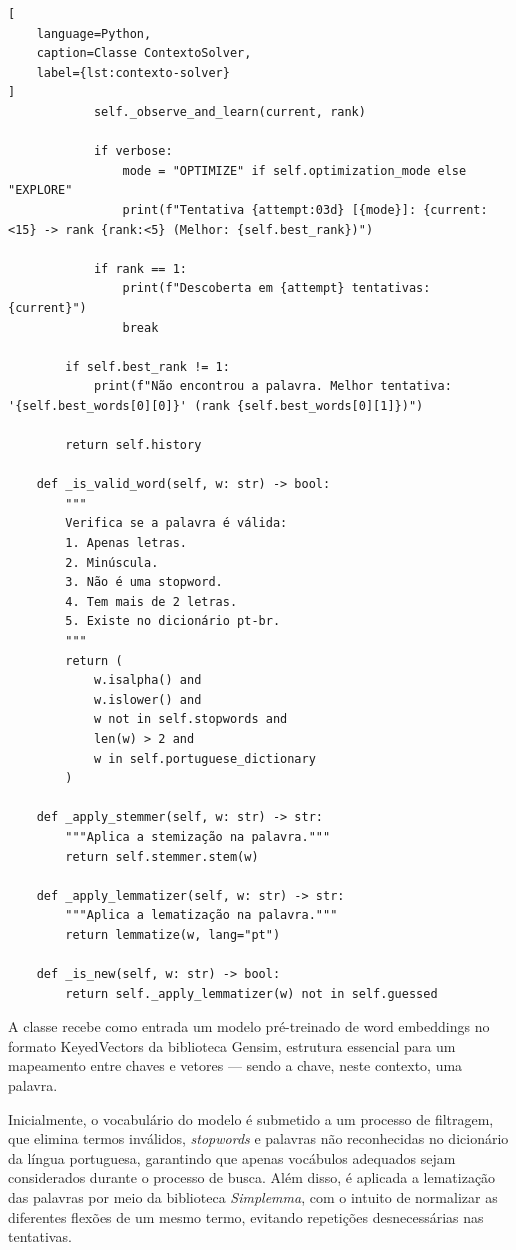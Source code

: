 \begin{lstlisting}[
    language=Python,
    caption=Classe ContextoSolver,
    label={lst:contexto-solver}
]
            self._observe_and_learn(current, rank)
            
            if verbose:
                mode = "OPTIMIZE" if self.optimization_mode else "EXPLORE"
                print(f"Tentativa {attempt:03d} [{mode}]: {current:<15} -> rank {rank:<5} (Melhor: {self.best_rank})")

            if rank == 1:
                print(f"Descoberta em {attempt} tentativas: {current}")
                break
        
        if self.best_rank != 1:
            print(f"Não encontrou a palavra. Melhor tentativa: '{self.best_words[0][0]}' (rank {self.best_words[0][1]})")

        return self.history
    
    def _is_valid_word(self, w: str) -> bool:
        """
        Verifica se a palavra é válida:
        1. Apenas letras.
        2. Minúscula.
        3. Não é uma stopword.
        4. Tem mais de 2 letras.
        5. Existe no dicionário pt-br.
        """
        return (
            w.isalpha() and
            w.islower() and
            w not in self.stopwords and
            len(w) > 2 and
            w in self.portuguese_dictionary
        )
    
    def _apply_stemmer(self, w: str) -> str:
        """Aplica a stemização na palavra."""
        return self.stemmer.stem(w)
    
    def _apply_lemmatizer(self, w: str) -> str:
        """Aplica a lematização na palavra."""
        return lemmatize(w, lang="pt")
    
    def _is_new(self, w: str) -> bool:
        return self._apply_lemmatizer(w) not in self.guessed
\end{lstlisting}

A classe recebe como entrada um modelo pré-treinado de word embeddings no formato KeyedVectors da biblioteca Gensim, estrutura essencial para um mapeamento entre chaves e vetores — sendo a chave, neste contexto, uma palavra.

Inicialmente, o vocabulário do modelo é submetido a um processo de filtragem, que elimina termos inválidos, \textit{stopwords} e palavras não reconhecidas no dicionário da língua portuguesa, garantindo que apenas vocábulos adequados sejam considerados durante o processo de busca. Além disso, é aplicada a lematização das palavras por meio da biblioteca \textit{Simplemma}, com o intuito de normalizar as diferentes flexões de um mesmo termo, evitando repetições desnecessárias nas tentativas.

